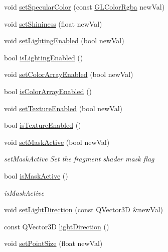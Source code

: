 \begin{DoxyCompactItemize}
void \mbox{\hyperlink{class_g_l_e_s_renderer_a1ab28a7a363508c57024fbbd67c30481}{set\+Specular\+Color}} (const \mbox{\hyperlink{class_g_l_color_rgba}{G\+L\+Color\+Rgba}} new\+Val)
\item 
void \mbox{\hyperlink{class_g_l_e_s_renderer_a75fdf201c7a27ab2e053e2a5d37e4ac4}{set\+Shininess}} (float new\+Val)
\item 
void \mbox{\hyperlink{class_g_l_e_s_renderer_ae6e3531d53ffdc334688eec3feaf9e77}{set\+Lighting\+Enabled}} (bool new\+Val)
\item 
bool \mbox{\hyperlink{class_g_l_e_s_renderer_a72a9b248926c08a45dfea70b8f0e22ca}{is\+Lighting\+Enabled}} ()
\item 
void \mbox{\hyperlink{class_g_l_e_s_renderer_a990ae5bda053d007a710e7e9956facf1}{set\+Color\+Array\+Enabled}} (bool new\+Val)
\item 
bool \mbox{\hyperlink{class_g_l_e_s_renderer_a79ef99aaf1e080612cad7ce4e77580bd}{is\+Color\+Array\+Enabled}} ()
\item 
void \mbox{\hyperlink{class_g_l_e_s_renderer_a83f1e3ddcb613eea7e74fa6ce4289350}{set\+Texture\+Enabled}} (bool new\+Val)
\item 
bool \mbox{\hyperlink{class_g_l_e_s_renderer_afedd8e9ef1c5804d070f3c79baa15439}{is\+Texture\+Enabled}} ()
\item 
void \mbox{\hyperlink{class_g_l_e_s_renderer_a957d299ae6eafc6604b5de598f525c6d}{set\+Mask\+Active}} (bool new\+Val)
\begin{DoxyCompactList}\small\item\em set\+Mask\+Active Set the fragment shader mask flag \end{DoxyCompactList}\item 
bool \mbox{\hyperlink{class_g_l_e_s_renderer_a256990132d3f0ceff02a369db1361c2c}{is\+Mask\+Active}} ()
\begin{DoxyCompactList}\small\item\em is\+Mask\+Active \end{DoxyCompactList}\item 
void \mbox{\hyperlink{class_g_l_e_s_renderer_a4f755a8549d3ecbb2a40cabe56974c5f}{set\+Light\+Direction}} (const Q\+Vector3D \&new\+Val)
\item 
const Q\+Vector3D \mbox{\hyperlink{class_g_l_e_s_renderer_a12a75a5ea065e69ad3476344e59f5909}{light\+Direction}} ()
\item 
void \mbox{\hyperlink{class_g_l_e_s_renderer_a2ea9d299d160c0757f75e883164f6e21}{set\+Point\+Size}} (float new\+Val)
\item 

\end{DoxyCompactItemize}
